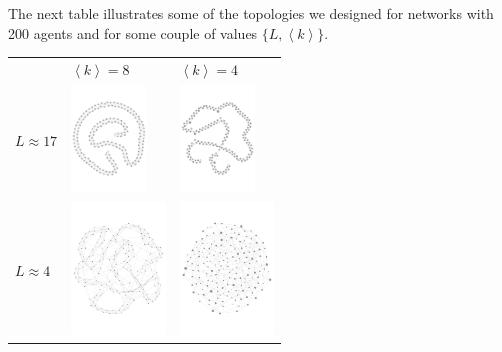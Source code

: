 \documentclass[a1paper,portrait,showframe,fontscale=.46]{baposter}
\begin{document}
\begin{poster}
{\begin{multicols}{2}
					\columnbreak 

					The next table illustrates some of the topologies we designed for networks with 200 agents and for some couple of values $\{L,\left\langle k\right\rangle\}$.
					\begin{center}
						\begin{tabular}{m{1.2cm}m{2cm}m{2cm}}
							&$\left\langle k\right\rangle=8$ & $\left\langle k\right\rangle=4$\\
							$L\approx17$&
							\includegraphics[width=2cm]{img/g02.pdf}&
							\includegraphics[width=2cm]{img/g00.pdf}\\
							$L\approx4$&
							\includegraphics[width=2.5cm]{img/g42.pdf}&
							\includegraphics[width=2.5cm]{img/g40.pdf}\\
						\end{tabular}
					\end{center}

\end{multicols}}
\end{poster}
\end{document}
